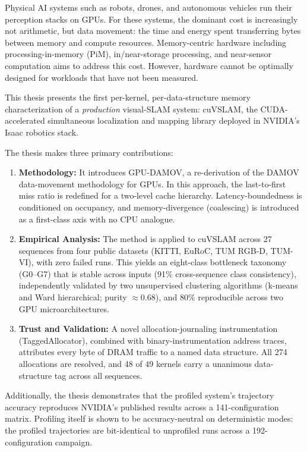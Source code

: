 Physical AI systems such as robots, drones, and autonomous vehicles run their perception stacks on GPUs. For these systems, the dominant cost is increasingly not arithmetic, but data movement: the time and energy spent transferring bytes between memory and compute resources. Memory-centric hardware including processing-in-memory (PiM), in/near-storage processing, and near-sensor computation aims to address this cost. However, hardware cannot be optimally designed for workloads that have not been measured.

This thesis presents the first per-kernel, per-data-structure memory characterization of a \emph{production} visual-SLAM system: cuVSLAM, the CUDA-accelerated simultaneous localization and mapping library deployed in NVIDIA's Isaac robotics stack.

The thesis makes three primary contributions:
\begin{enumerate}
\item \textbf{Methodology:} It introduces GPU-DAMOV, a re-derivation of the DAMOV data-movement methodology for GPUs. In this approach, the last-to-first miss ratio is redefined for a two-level cache hierarchy. Latency-boundedness is conditioned on occupancy, and memory-divergence (coalescing) is introduced as a first-class axis with no CPU analogue.

\item \textbf{Empirical Analysis:} The method is applied to cuVSLAM across 27 sequences from four public datasets (KITTI, EuRoC, TUM RGB-D, TUM-VI), with zero failed runs. This yields an eight-class bottleneck taxonomy (G0–G7) that is stable across inputs (91\% cross-sequence class consistency), independently validated by two unsupervised clustering algorithms (k-means and Ward hierarchical; purity $\approx$0.68), and 80\% reproducible across two GPU microarchitectures.

\item \textbf{Trust and Validation:} A novel allocation-journaling instrumentation (TaggedAllocator), combined with binary-instrumentation address traces, attributes every byte of DRAM traffic to a named data structure. All 274 allocations are resolved, and 48 of 49 kernels carry a unanimous data-structure tag across all sequences.
\end{enumerate}

Additionally, the thesis demonstrates that the profiled system's trajectory accuracy reproduces NVIDIA’s published results across a 141-configuration matrix. Profiling itself is shown to be accuracy-neutral on deterministic modes: the profiled trajectories are bit-identical to unprofiled runs across a 192-configuration campaign.


